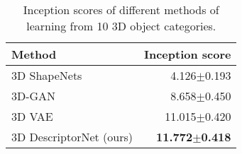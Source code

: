 \documentclass[10pt,twocolumn,letterpaper]{article}
\begin{document}


\begin{table}
\centering
\begin{small}
\caption{Inception scores of different methods of learning from 10 3D object categories.}\label{tb:inception}
\vspace{-2mm}
\begin{tabular}{|l|r|}
\hline 
Method &  Inception score \\ \hline \hline
3D ShapeNets \cite{wu20153d} & 4.126$\pm$0.193    \\ \hline
3D-GAN \cite{3dgan}& 8.658$\pm$0.450     \\ \hline
3D VAE \cite{kingma2013auto} & 11.015$\pm$0.420\\ \hline
3D DescriptorNet (ours) &  \textbf{11.772$\pm$0.418} \\ \hline
\end{tabular}
\end{small}
\end{table}
\vspace{-2mm}
\end{document}
